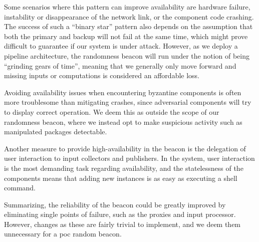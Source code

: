 Some scenarios where this pattern can improve availability are hardware failure, instability or disappearance of the network link, or the component code crashing.
The success of such a \enquote{binary star} pattern also depends on the assumption that both the primary and backup will not fail at the same time, which might prove difficult to guarantee if our system is under attack.
However, as we deploy a pipeline architecture, the randomness beacon will run under the notion of being \enquote{grinding gears of time}, meaning that we generally only move forward and missing inputs or computations is considered an affordable loss.

Avoiding availability issues when encountering byzantine components is often more troublesome than mitigating crashes, since adversarial components will try to display correct operation.
We deem this as outside the scope of our randomness beacon, where we instead opt to make suspicious activity such as manipulated packages detectable.

Another measure to provide high-availability in the beacon is the delegation of user interaction to input collectors and publishers.
In the system, user interaction is the most demanding task regarding availability, and the statelessness of the components means that adding new instances is as easy as executing a shell command.

Summarizing, the reliability of the beacon could be greatly improved by eliminating single points of failure, such as the proxies and input processor.
However, changes as these are fairly trivial to implement, and we deem them unnecessary for a \gls{poc} random beacon.